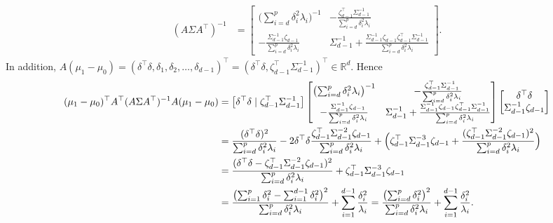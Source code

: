 \documentclass[10pt]{article}
\begin{document}
\begin{equation}
\begin{split}
(A \Sigma A^{\top})^{-1} &= \begin{bmatrix} \bigl(\sum_{i=d}^{p} \delta_i^{2} \lambda_i\bigr)^{-1} & - \frac{\zeta_{d-1}^{\top} \Sigma_{d-1}^{-1}}{\sum_{i=d}^{p} \delta_i^{2} \lambda_i} \\
 - \frac{\Sigma_{d-1}^{-1} \zeta_{d-1}}{\sum_{i=d}^{p} \delta_i^{2} \lambda_i}
  & \Sigma_{d-1}^{-1} + \frac{\Sigma_{d-1}^{-1} \zeta_{d-1} \zeta_{d-1}^{\top} \Sigma_{d-1}^{-1}}{\sum_{i=d}^{p} \delta_i^{2} \lambda_i}
\end{bmatrix}.
\end{split}
\end{equation}
In addition, $A(\mu_1 - \mu_0) = (\delta^{\top} \delta, \delta_1, \delta_2, \dots, \delta_{d-1})^{\top} = (\delta^{\top} \delta, \zeta_{d-1}^{\top} \Sigma_{d-1}^{-1})^{\top} \in \mathbb{R}^{d}$. Hence
\begin{equation*}
\begin{split}
(\mu_1 - \mu_0)^{\top} A^{\top} (A \Sigma A^{\top})^{-1} A (\mu_1 - \mu_0) &=
\bigl[\delta^{\top} \delta \mid \zeta_{d-1}^{\top} \Sigma_{d-1}^{-1} \bigr]
\begin{bmatrix} \bigl(\sum_{i=d}^{p} \delta_i^{2} \lambda_i\bigr)^{-1} & - \frac{\zeta_{d-1}^{\top} \Sigma_{d-1}^{-1}}{\sum_{i=d}^{p} \delta_i^{2} \lambda_i} \\
 - \frac{\Sigma_{d-1}^{-1} \zeta_{d-1}}{\sum_{i=d}^{p} \delta_i^{2} \lambda_i}
  & \Sigma_{d-1}^{-1} + \frac{\Sigma_{d-1}^{-1} \zeta_{d-1} \zeta_{d-1}^{\top} \Sigma_{d-1}^{-1}}{\sum_{i=d}^{p} \delta_i^{2} \lambda_i} \end{bmatrix} \begin{bmatrix} \delta^{\top} \delta \\ \Sigma_{d-1}^{-1} \zeta_{d-1} \end{bmatrix} \\
  &= \frac{(\delta^{\top} \delta)^{2}}{\sum_{i=d}^{p} \delta_i^{2} \lambda_i} - 2 \delta^{\top} \delta \frac{\zeta_{d-1}^{\top} \Sigma_{d-1}^{-2} \zeta_{d-1}}{\sum_{i=d}^{p} \delta_i^2 \lambda_i} + \Bigl(\zeta_{d-1}^{\top} \Sigma_{d-1}^{-3} \zeta_{d-1} + \frac{(\zeta_{d-1}^{\top} \Sigma_{d-1}^{-2} \zeta_{d-1})^{2}}{\sum_{i=d}^{p} \delta_i^{2} \lambda_i} \Bigr) \\
  &= \frac{(\delta^{\top} \delta - \zeta_{d-1}^{\top} \Sigma_{d-1}^{-2} \zeta_{d-1})^{2}}{\sum_{i=d}^{p} \delta_i^{2} \lambda_i} + \zeta_{d-1}^{\top} \Sigma_{d-1}^{-3} \zeta_{d-1} \\
  &= \frac{\bigl(\sum_{i=1}^{p} \delta_i^{2} - \sum_{i=1}^{d-1} \delta_i^{2}\bigr)^{2}}{\sum_{i=d}^{p} \delta_i^{2} \lambda_i} + \sum_{i=1}^{d-1} \frac{\delta_i^{2}}{\lambda_i} = \frac{\bigl(\sum_{i=d}^{p} \delta_i^{2}\bigr)^{2}}{\sum_{i=d}^{p} \delta_i^{2} \lambda_i} + \sum_{i=1}^{d-1} \frac{\delta_i^{2}}{\lambda_i}.
\end{split}
\end{equation*}
\end{document}
